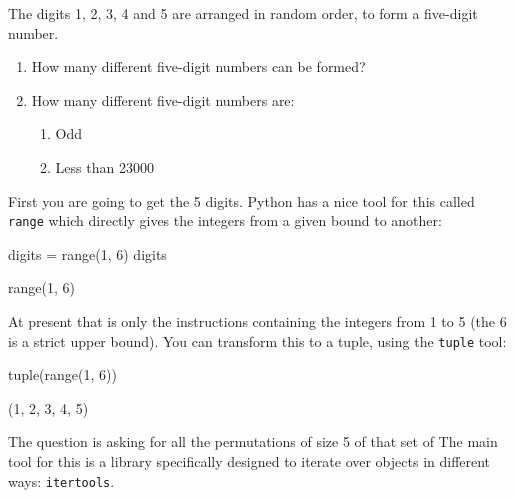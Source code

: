 The digits 1, 2, 3, 4 and 5 are arranged in random order, to form a five-digit number.
\begin{enumerate}

\item 

How many different five-digit numbers can be formed?

\item 

How many different five-digit numbers are:
\begin{enumerate}

\item 

Odd

\item 

Less than 23000

\end{enumerate}

\end{enumerate}



First you are going to get the 5 digits. Python has a nice tool for this called
\texttt{range} which directly gives the integers from a given bound to another:




\begin{pyin}
digits = range(1, 6)
digits
\end{pyin}





\begin{raw}
range(1, 6)
\end{raw}





At present that is only the instructions containing the integers from 1 to 5
(the 6 is a strict upper bound). You can transform this to a tuple, using the
\texttt{tuple} tool:




\begin{pyin}
tuple(range(1, 6))
\end{pyin}





\begin{raw}
(1, 2, 3, 4, 5)
\end{raw}

The question is asking for all the permutations of size 5 of that set of
The main tool for this is a library specifically designed to iterate over
objects in different ways: \texttt{itertools}.





